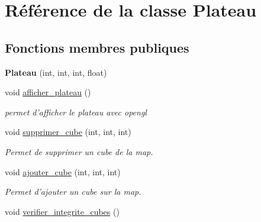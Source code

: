 \hypertarget{classPlateau}{\section{Référence de la classe Plateau}
\label{classPlateau}
}
\subsection*{Fonctions membres publiques}
\begin{DoxyCompactItemize}
\item 
\hypertarget{classPlateau_ab0ce9c3f8d8644c622890366ceb478c8}{{\bfseries Plateau} (int, int, int, float)}\label{classPlateau_ab0ce9c3f8d8644c622890366ceb478c8}

\item 
\hypertarget{classPlateau_a33ebd454a5a1471401c715b7069efb69}{void \hyperlink{classPlateau_a33ebd454a5a1471401c715b7069efb69}{afficher\-\_\-plateau} ()}\label{classPlateau_a33ebd454a5a1471401c715b7069efb69}

\begin{DoxyCompactList}\small\item\em permet d'afficher le plateau avec opengl \end{DoxyCompactList}\item 
\hypertarget{classPlateau_a2448e265658f9ba1395b1a5961d0e70c}{void \hyperlink{classPlateau_a2448e265658f9ba1395b1a5961d0e70c}{supprimer\-\_\-cube} (int, int, int)}\label{classPlateau_a2448e265658f9ba1395b1a5961d0e70c}

\begin{DoxyCompactList}\small\item\em Permet de supprimer un cube de la map. \end{DoxyCompactList}\item 
\hypertarget{classPlateau_ad31477b73aec12d467075db6a1f24530}{void \hyperlink{classPlateau_ad31477b73aec12d467075db6a1f24530}{ajouter\-\_\-cube} (int, int, int)}\label{classPlateau_ad31477b73aec12d467075db6a1f24530}

\begin{DoxyCompactList}\small\item\em Permet d'ajouter un cube sur la map. \end{DoxyCompactList}\item 
\hypertarget{classPlateau_a1ee031a882c90fa2a82c115c7eedd844}{void \hyperlink{classPlateau_a1ee031a882c90fa2a82c115c7eedd844}{verifier\-\_\-integrite\-\_\-cubes} ()}\label{classPlateau_a1ee031a882c90fa2a82c115c7eedd844}


\end{DoxyCompactItemize}
